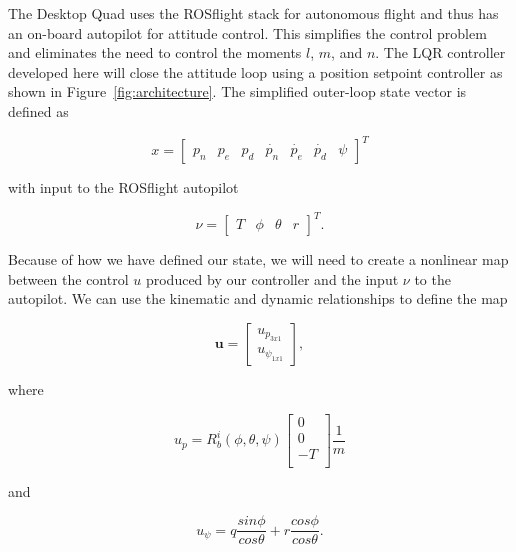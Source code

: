 \documentclass[12pt]{article}
\begin{document}
The Desktop Quad uses the ROSflight \cite{rosflight} stack for autonomous flight and thus has an on-board autopilot for attitude control. This simplifies the control problem and eliminates the need to control the moments $l$, $m$, and $n$. The LQR controller developed here will close the attitude loop using a position setpoint controller as shown in Figure~\ref{fig:architecture}. The simplified outer-loop state vector is defined as

\singlespacing
\begin{equation*}
x =
\begin{bmatrix}
p_n & p_e & p_d & \dot{p_n} & \dot{p_e} & \dot{p_d} & \psi
\end{bmatrix}
^T
\end{equation*}
\doublespacing

\noindent with input to the ROSflight autopilot

\singlespacing
\begin{equation*}
\nu =
\begin{bmatrix}
T & \phi & \theta & r
\end{bmatrix}^T.
\end{equation*}
\doublespacing

Because of how we have defined our state, we will need to create a nonlinear map between the control $u$ produced by our controller and the input $\nu$ to the autopilot. We can use the kinematic and dynamic relationships to define the map

\begin{equation}
\boldsymbol{u} = 
\begin{bmatrix}
u_{p_{3x1}} \\
u_{{\psi}_{1x1}}
\end{bmatrix},
\end{equation}

\noindent where

\begin{equation}
u_p =
R_b^i(\phi, \theta, \psi)
\begin{bmatrix}
0  \\
0  \\
-T \\
\end{bmatrix}
\frac{1}{m}
\end{equation}

\noindent and

\begin{equation}
u_{\psi} =
q\frac{sin\phi}{cos\theta} + r\frac{cos\phi}{cos\theta}.
\end{equation}
\end{document}
